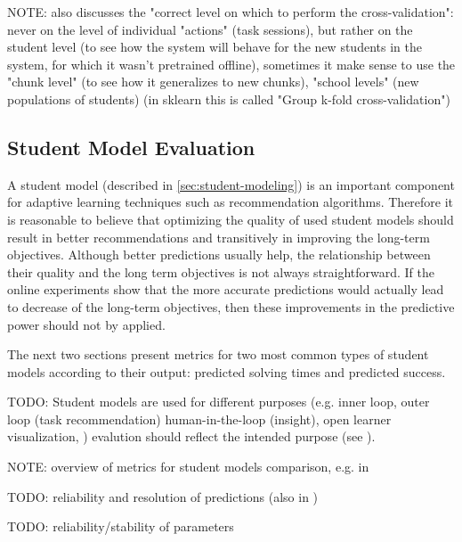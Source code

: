 
NOTE: \cite{student-models-review-2012} also discusses the "correct level on
which to perform the cross-validation": never on the level of individual
"actions" (task sessions), but rather on the student level (to see how the
system will behave for the new students in the system, for which it wasn't
pretrained offline), sometimes it make sense to use the "chunk level"
(to see how it generalizes to new chunks), "school levels" (new populations of
students)
(in sklearn this is called "Group k-fold cross-validation")

\subsection{Student Model Evaluation}
\label{sec:student-model-evaluation}

A student model (described in \ref{sec:student-modeling})
  is an important component for adaptive learning techniques
  such as recommendation algorithms.
Therefore it is reasonable to believe that optimizing the quality
  of used student models should result in better recommendations
  and transitively in improving the long-term objectives.
Although better predictions usually help,
  the relationship between their quality and the long term objectives
  is not always straightforward.
If the online experiments show that the more accurate predictions would actually
  lead to decrease of the long-term objectives,
  then these improvements in the predictive power should not by applied.

The next two sections present metrics for two most common
  types of student models according to their output:
  predicted solving times and predicted success.


TODO: Student models are used for different purposes
(e.g. inner loop, outer loop (task recommendation) human-in-the-loop (insight),
open learner visualization, )
evalution should reflect the intended purpose
(see \cite{pelanek-learner-modeling}).

NOTE: overview of metrics for student models comparison, e.g. in \cite{pelanek-evaluation-student-models}

TODO: reliability and resolution of predictions (also in \cite{pelanek-evaluation-student-models})

TODO: reliability/stability of parameters

